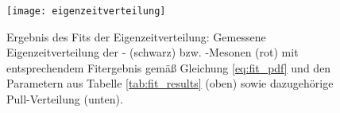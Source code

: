 \begin{figure}[hptb]
\centering
\texttt{[image: eigenzeitverteilung]}
\caption{Ergebnis des Fits der Eigenzeitverteilung: Gemessene Eigenzeitverteilung der \Bd- (schwarz) bzw. \Bdbar-Mesonen (rot) mit entsprechendem Fitergebnis gemäß Gleichung \ref{eq:fit_pdf} und den Parametern aus Tabelle \ref{tab:fit_results} (oben) sowie dazugehörige Pull-Verteilung (unten).}
\label{fig:fit_result}
\end{figure}